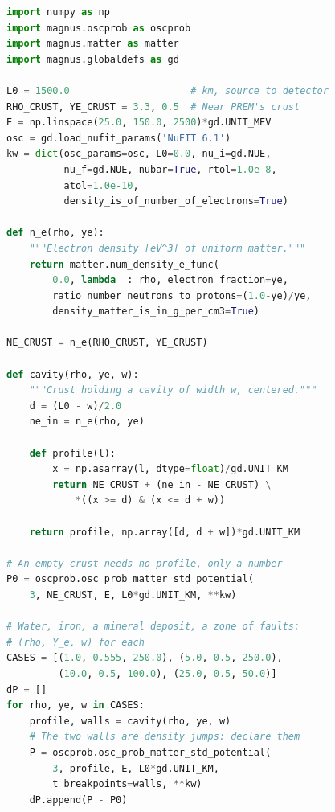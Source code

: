 \documentclass[final,5p,times,twocolumn,sort,compress]{elsarticle}
\makeatletter
\DeclareRobustCommand{\_}{%
  \ifmmode\nfss@text{\textunderscore}\else\textunderscore\allowbreak\fi}
\providecommand{\Ref}{}
\makeatother
\begin{document}
\begin{lstlisting}[language=Python, caption={\textbf{A cavity in the Earth's crust.} A cavity search, after \Ref\ \cite{Arguelles:2012nw}: the $\bar{\nu}_e$ survival probability over 1\,500~km of Earth's crust, with and without a cavity of different density centered on the baseline. A cavity is a density profile with two walls, whose positions are declared as breakpoints so that the refinement ladder runs inside the cavity. See notebook \#28 and Sec.~\ref{sec:cavity} for details.}, label={lst:cavity}, float=tbp]
import numpy as np
import magnus.oscprob as oscprob
import magnus.matter as matter
import magnus.globaldefs as gd

L0 = 1500.0                     # km, source to detector
RHO_CRUST, YE_CRUST = 3.3, 0.5  # Near PREM's crust
E = np.linspace(25.0, 150.0, 2500)*gd.UNIT_MEV
osc = gd.load_nufit_params('NuFIT 6.1')
kw = dict(osc_params=osc, L0=0.0, nu_i=gd.NUE,
          nu_f=gd.NUE, nubar=True, rtol=1.0e-8,
          atol=1.0e-10,
          density_is_of_number_of_electrons=True)

def n_e(rho, ye):
    """Electron density [eV^3] of uniform matter."""
    return matter.num_density_e_func(
        0.0, lambda _: rho, electron_fraction=ye,
        ratio_number_neutrons_to_protons=(1.0-ye)/ye,
        density_matter_is_in_g_per_cm3=True)

NE_CRUST = n_e(RHO_CRUST, YE_CRUST)

def cavity(rho, ye, w):
    """Crust holding a cavity of width w, centered."""
    d = (L0 - w)/2.0
    ne_in = n_e(rho, ye)

    def profile(l):
        x = np.asarray(l, dtype=float)/gd.UNIT_KM
        return NE_CRUST + (ne_in - NE_CRUST) \
            *((x >= d) & (x <= d + w))

    return profile, np.array([d, d + w])*gd.UNIT_KM

# An empty crust needs no profile, only a number
P0 = oscprob.osc_prob_matter_std_potential(
    3, NE_CRUST, E, L0*gd.UNIT_KM, **kw)

# Water, iron, a mineral deposit, a zone of faults:
# (rho, Y_e, w) for each
CASES = [(1.0, 0.555, 250.0), (5.0, 0.5, 250.0),
         (10.0, 0.5, 100.0), (25.0, 0.5, 50.0)]
dP = []
for rho, ye, w in CASES:
    profile, walls = cavity(rho, ye, w)
    # The two walls are density jumps: declare them
    P = oscprob.osc_prob_matter_std_potential(
        3, profile, E, L0*gd.UNIT_KM,
        t_breakpoints=walls, **kw)
    dP.append(P - P0)
\end{lstlisting}
\end{document}

